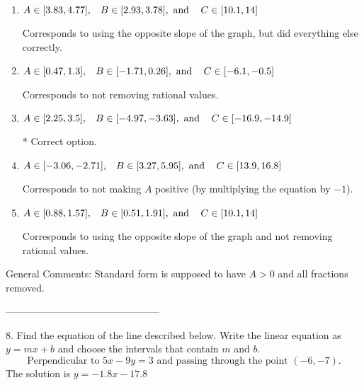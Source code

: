 \documentclass{article}[10pt]
\begin{document}
\begin{enumerate}[label=\Alph*.] 
\item $ A \in [3.83, 4.77], \hspace{3mm} B \in [2.93, 3.78], \text{ and } \hspace{3mm} C \in [10.1, 14] $ 

  Corresponds to using the opposite slope of the graph, but did everything else correctly. 
\item $ A \in [0.47, 1.3], \hspace{3mm} B \in [-1.71, 0.26], \text{ and } \hspace{3mm} C \in [-6.1, -0.5] $ 

  Corresponds to not removing rational values. 
\item $ A \in [2.25, 3.5], \hspace{3mm} B \in [-4.97, -3.63], \text{ and } \hspace{3mm} C \in [-16.9, -14.9] $ 

 * Correct option. 
\item $ A \in [-3.06, -2.71], \hspace{3mm} B \in [3.27, 5.95], \text{ and } \hspace{3mm} C \in [13.9, 16.8] $ 

  Corresponds to not making $A$ positive (by multiplying the equation by $-1$). 
\item $ A \in [0.88, 1.57], \hspace{3mm} B \in [0.51, 1.91], \text{ and } \hspace{3mm} C \in [10.1, 14] $ 

  Corresponds to using the opposite slope of the graph and not removing rational values. 
\end{enumerate} 
 
General Comments: Standard form is supposed to have $A > 0$ and all fractions removed.

-----------------------------------------------

8. Find the equation of the line described below. Write the linear equation as $ y=mx+b $ and choose the intervals that contain $m$ and $b$.
$$ \text{Perpendicular to } 5 x - 9 y = 3 \text{ and passing through the point } (-6, -7). $$ 
The solution is $ y = -1.8 x - 17.8 $ 
\end{document}
